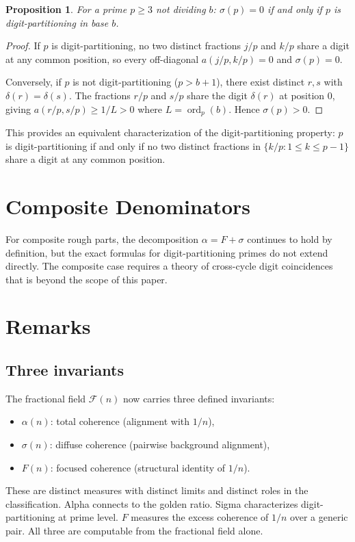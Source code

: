\documentclass[12pt]{amsart}
\newtheorem{proposition}[theorem]{Proposition}
\theoremstyle{definition}
\theoremstyle{remark}
\begin{document}
\begin{proposition}\label{prop:sigma-zero}
For a prime $p \ge 3$ not dividing $b$:
$\sigma(p) = 0$ if and only if $p$ is
digit-partitioning in base $b$.
\end{proposition}

\begin{proof}
If $p$ is digit-partitioning, no two distinct fractions
$j/p$ and $k/p$ share a digit at any common position,
so every off-diagonal $a(j/p, k/p) = 0$ and
$\sigma(p) = 0$.

Conversely, if $p$ is not digit-partitioning
($p > b{+}1$), there exist distinct $r, s$ with
$\delta(r) = \delta(s)$. The fractions $r/p$ and $s/p$
share the digit $\delta(r)$ at position $0$, giving
$a(r/p, s/p) \ge 1/L > 0$ where
$L = \operatorname{ord}_p(b)$. Hence $\sigma(p) > 0$.
\end{proof}

This provides an equivalent characterization of the
digit-partitioning property: $p$ is digit-partitioning if and
only if no two
distinct fractions in $\{k/p : 1 \le k \le p{-}1\}$ share a digit
at any common position.

\section{Composite Denominators}

For composite rough parts, the decomposition
$\alpha = F + \sigma$ continues to hold by definition,
but the exact formulas for digit-partitioning primes
do not extend directly. The composite case requires a
theory of cross-cycle digit coincidences that is beyond
the scope of this paper.

\section{Remarks}

\subsection*{Three invariants}

The fractional field $\mathcal{F}(n)$ now carries three defined
invariants:
\begin{itemize}
\item $\alpha(n)$: total coherence (alignment with $1/n$),
\item $\sigma(n)$: diffuse coherence (pairwise background alignment),
\item $F(n)$: focused coherence (structural identity of $1/n$).
\end{itemize}
These are distinct measures with distinct limits and distinct roles
in the classification. Alpha connects to the golden ratio. Sigma
characterizes digit-partitioning at prime level. $F$ measures
the excess coherence of $1/n$ over a generic pair. All
three are computable from the fractional field alone.
\end{document}
